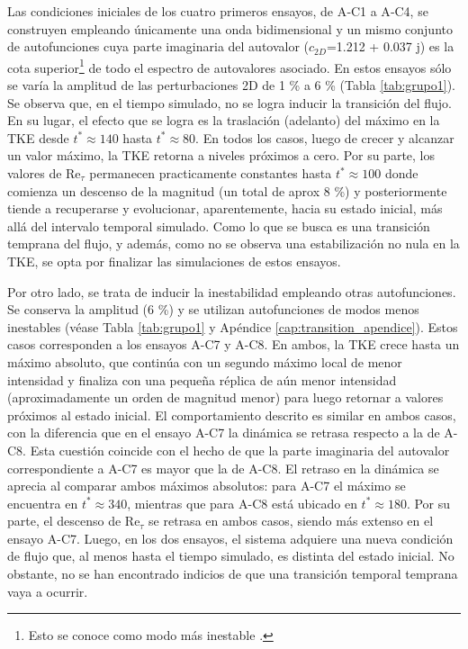 Las condiciones iniciales de los cuatro primeros ensayos, de A‑C1 a A‑C4, se construyen empleando únicamente una onda bidimensional y un mismo conjunto de autofunciones cuya parte imaginaria del autovalor ($c_{2D}$=1.212 + 0.037 j) es la cota superior\footnote{Esto  se conoce como modo más inestable \cite{schmid}.} de todo el espectro de autovalores asociado. En estos ensayos sólo se varía la amplitud de las perturbaciones 2D de 1 \% a 6 \% (Tabla \ref{tab:grupo1}). Se observa que, en el tiempo simulado, no se logra inducir la transición del flujo. En su lugar, el efecto que se logra es la traslación (adelanto) del máximo en la TKE desde $t^* \approx 140$ hasta $t^* \approx 80$. En todos los casos, luego de crecer y alcanzar un valor máximo, la TKE retorna a niveles próximos a cero. Por su parte, los valores de Re$_{\tau}$ permanecen practicamente constantes hasta $t^* \approx 100$ donde comienza un descenso de la magnitud (un total de aprox 8 \%) y posteriormente tiende a recuperarse y evolucionar, aparentemente, hacia su estado inicial, más allá del intervalo temporal simulado. Como lo que se busca es una transición temprana del flujo, y además, como no se observa una estabilización no nula en la TKE, se opta por finalizar las simulaciones de estos ensayos.  

Por otro lado, se trata de inducir la inestabilidad empleando otras autofunciones. Se conserva la amplitud (6 \%) y se utilizan autofunciones de modos menos inestables (véase Tabla \ref{tab:grupo1} y Apéndice \ref{cap:transition_apendice}). Estos casos corresponden a los ensayos A-C7 y A-C8. En ambos, la TKE crece hasta un máximo absoluto, que continúa con un segundo máximo local de menor intensidad y finaliza con una pequeña réplica de aún menor intensidad (aproximadamente un orden de magnitud menor) para luego retornar a valores próximos al estado inicial. El comportamiento descrito es similar en ambos casos, con la diferencia que en el ensayo A-C7 la dinámica se retrasa respecto a la de A-C8. Esta cuestión coincide con el hecho de que la parte imaginaria del autovalor correspondiente a A-C7 es mayor que la de A-C8. El retraso en la dinámica se aprecia al comparar ambos máximos absolutos: para A-C7 el máximo se encuentra en $t^* \approx 340$, mientras que para A-C8 está ubicado en  $t^* \approx 180$. Por su parte, el descenso de Re$_{\tau}$ se retrasa en ambos casos, siendo más extenso en el ensayo A-C7. Luego, en los dos ensayos, el sistema adquiere una nueva condición de flujo que, al menos hasta el tiempo simulado, es distinta del estado inicial. No obstante, no se han encontrado indicios de que una transición temporal temprana vaya a ocurrir.  

